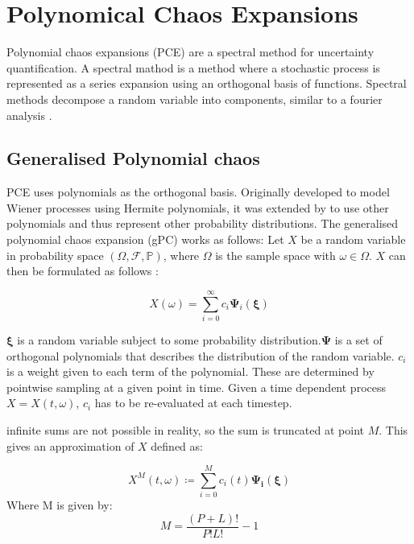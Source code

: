 
\section{Polynomical Chaos Expansions}
Polynomial chaos expansions (PCE) are a spectral method for uncertainty quantification. A spectral mathod is a method where a
stochastic process is represented as a series expansion using an orthogonal basis of functions. Spectral methods
decompose a random variable into components, similar to a fourier analysis \parencite{heuvelineHybridGeneralizedPolynomial2014}.

\subsection{Generalised Polynomial chaos}
PCE uses polynomials as the orthogonal basis. Originally developed to model Wiener processes using Hermite polynomials, it was extended by
\textcite{xiuWienerAskeyPolynomial2002} to use other polynomials and thus represent other probability distributions. The
generalised polynomial chaos expansion (gPC) works as follows:
Let \(X\) be a random variable in probability space \(\left(\Omega, \mathcal{F}, \mathbb{P}\right)\), where \(\Omega\) is
the sample space with \(\omega \in \Omega\). \(X\) can then be formulated as follows
\parencite{heuvelineHybridGeneralizedPolynomial2014}:

\begin{equation}
\label{eq:gPC_explain_X}
X(\omega) = \sum_{i = 0}^{\infty}c_i\boldsymbol{\Psi}_i(\boldsymbol{\xi})
\end{equation}

\(\boldsymbol{\xi}\) is a random variable subject to some probability distribution.\({\boldsymbol{\Psi}}\) is a set of orthogonal polynomials that describes the
distribution of the random variable. \(c_i\) is a weight given to each term of the polynomial. These are determined by
pointwise sampling at a given point in time. Given a time dependent process \(X = X(t, \omega)\), \(c_i\) has to be
re-evaluated at each timestep. 

infinite sums are not possible in reality, so the sum is truncated at point \(M\). This gives an approximation of \(X\)
defined as:

\begin{equation}
X^M(t, \omega) \coloneq \sum_{i = 0}^{M}c_i(t)\boldsymbol{\Psi_i}(\boldsymbol{\xi})
\end{equation}
Where M is given by:
\begin{equation}
M = \frac{(P + L)!}{P!L!} - 1
\end{equation}

